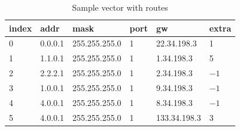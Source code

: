 \documentclass[a4paper,marginparwidth=50pt,marginparsep=10pt]{article}
\begin{document}
\begin{table}[float=tph]
\begin{center}
\begin{tabular}{|l|l|l|l|l|l|}
\hline index & addr & mask & port & gw & extra\\ 
\hline 0 & 0.0.0.1 & 255.255.255.0 & 1& 22.34.198.3 & 1\\ 
\hline 1 & 1.1.0.1 & 255.255.255.0 & 1& 1.34.198.3 & 5\\
\hline 2 & 2.2.2.1 & 255.255.255.0 & 1& 2.34.198.3 & $-1$\\
\hline 3 & 1.0.0.1 & 255.255.255.0 & 1& 9.34.198.3 & $-1$\\
\hline 4 & 4.0.0.1 & 255.255.255.0 & 1& 8.34.198.3 & $-1$\\
\hline 5 & 4.0.0.1 & 255.255.255.0 & 1& 133.34.198.3 & 3\\
\hline
\end{tabular}
\end{center}
\caption{Sample vector with routes}
\label{tbl:vector}
\end{table}
\end{document}
